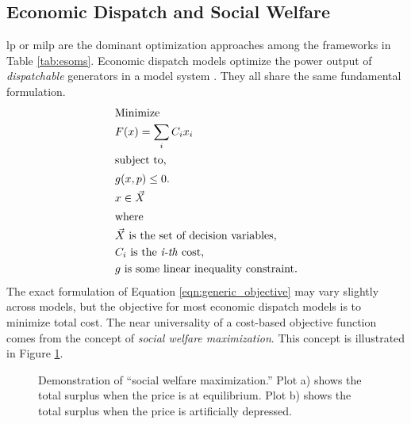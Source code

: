 \subsection{Economic Dispatch and Social Welfare}
\Ac{lp} or \ac{milp} are the dominant optimization approaches among the
frameworks in Table \ref{tab:esoms}. Economic dispatch models optimize the power
output of \textit{dispatchable} generators in a model system
\cite{de_queiroz_repurposing_2019, neumann_near-optimal_2021}. They all share
the same fundamental formulation.
\begin{align}
    \intertext{Minimize}
    \label{eqn:generic_objective}
    &F(x) = \sum_i C_i x_i\\
    \intertext{subject to,}
    &g(x, p) \leq 0.\nonumber\\
    &x \in \vec{X}\nonumber\\
    \intertext{where}
    &\vec{X} \text{ is the set of decision variables,}\nonumber\\
    & C_i \text{ is the \textit{i-th} cost,}\nonumber\\
    & g \text{ is some linear inequality constraint.}\nonumber
\end{align}
The exact formulation of Equation \ref{eqn:generic_objective} may vary slightly
across models, but the objective for most economic dispatch models is to
minimize total cost. The near universality of a cost-based objective function
comes from the concept of \textit{social welfare maximization}. This concept is
illustrated in Figure \ref{fig:social-max}.

\begin{figure}[H]
  \centering
  \resizebox{\columnwidth}{!}{}
  \caption{Demonstration of ``social welfare maximization.'' Plot a) shows the
  total surplus when the price is at equilibrium. Plot b) shows the total
  surplus when the price is artificially depressed.}
  \label{fig:social-max}
\end{figure}

